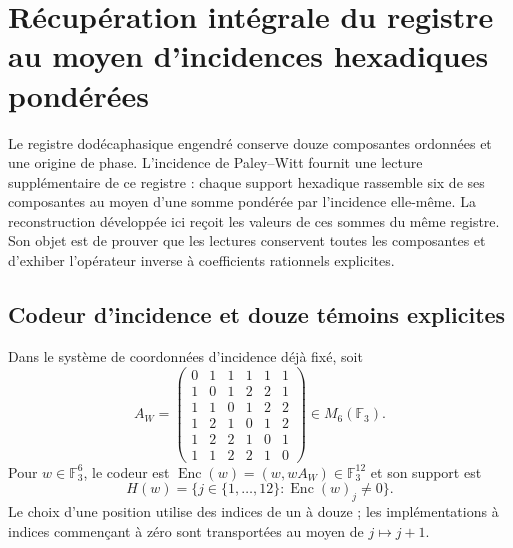 
\section[Récupération par incidences hexadiques]{Récupération intégrale du registre au moyen d'incidences hexadiques pondérées}
\label{rh:sec:recuperacion}

Le registre dodécaphasique engendré conserve douze composantes ordonnées et
une origine de phase. L'incidence de Paley--Witt fournit une lecture
supplémentaire de ce registre : chaque support hexadique rassemble six de ses
composantes au moyen d'une somme pondérée par l'incidence elle-même. La
reconstruction développée ici reçoit les valeurs de ces sommes
du même registre. Son objet est de prouver que les lectures conservent
toutes les composantes et d'exhiber l'opérateur inverse à coefficients
rationnels explicites.

\subsection{Codeur d'incidence et douze témoins explicites}

Dans le système de coordonnées d'incidence déjà fixé, soit
\[
A_W=\begin{pmatrix}
0&1&1&1&1&1\\1&0&1&2&2&1\\1&1&0&1&2&2\\
1&2&1&0&1&2\\1&2&2&1&0&1\\1&1&2&2&1&0
\end{pmatrix}\in M_6(\mathbb F_3).
\]
Pour $w\in\mathbb F_3^6$, le codeur est
$\operatorname{Enc}(w)=(w,wA_W)\in\mathbb F_3^{12}$ et son support
est
\[
H(w)=\{j\in\{1,\ldots,12\}:\operatorname{Enc}(w)_j\ne0\}.
\]
Le choix d'une position utilise des indices de un à douze ; les
implémentations à indices commençant à zéro sont transportées au moyen de
$j\mapsto j+1$.

